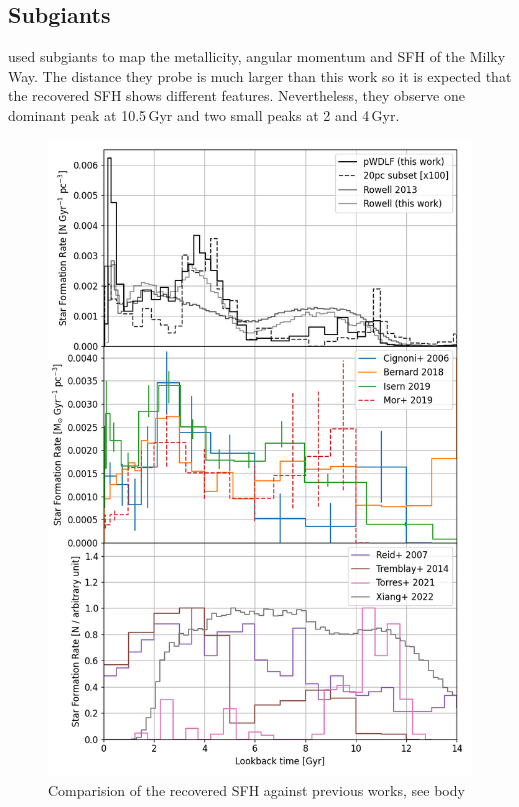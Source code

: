 \documentclass[fleqn,usenatbib]{mnras}
\begin{document}
\subsection{Subgiants}
\citet{2022Natur.603..599X} used subgiants to map the metallicity, angular
momentum and SFH of the Milky Way. The distance they probe is much larger
than this work so it is expected that the recovered SFH shows different
features. Nevertheless, they observe one dominant peak at 10.5\,Gyr and two
small peaks at 2 and 4\,Gyr.

\begin{figure}
  \includegraphics[width=\columnwidth]{figures/fig_08_compare_sfh.png}
  \caption{Comparision of the recovered SFH against previous works, see body
}
\end{figure}
\end{document}
